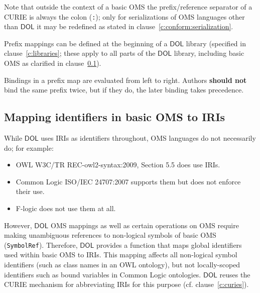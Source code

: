 \documentclass[10pt,fleqn,final]{scrreprt}
\makeatletter
\newcommand*{\cf}{cf.\@\xspace}
\newcommand*\CommentAuthor{}
\renewcommand*\CommentAuthor{#1}}
\newcommand*\CommentDate{}
\renewcommand*\CommentDate{#1}}
\newcommand*\CommentId{}
\renewcommand*\CommentId{#1}}
\newcommand*\CommentType{}
\renewcommand*\CommentType{#1}}
\newcommand*{\SetCommentColorByType}[1]{%
\edef\localType{{#1}}%
\expandafter\ifstrequal\localType{q-aut}{\colorlet{CommentColor}{red}}{%
\expandafter\ifstrequal\localType{q-all}{\colorlet{CommentColor}{orange}}{%
\expandafter\ifstrequal\localType{todo}{\colorlet{CommentColor}{orange}}{%
\expandafter\ifstrequal\localType{fyi}{\colorlet{CommentColor}{lightgray}}{%
\colorlet{CommentColor}{yellow}}}}}}
\newcommand*{\SetCommentPrefixByType}[1]{%
\edef\localType{{#1}}%
\expandafter\@ifmtarg\localType{%
\edef\CommentPrefix{}%
}{%
\caseupper[q]{#1}%
\edef\CommentPrefix{\thestring: }%
}}
\newcommand*{\initComment}[1]{%
\setkeys{Comment}{#1}%
\SetCommentColorByType{\CommentType}%
\relax%
\SetCommentPrefixByType{\CommentType}%
\relax%
}
\newcommand*{\todonote}[2][]{%
\initComment{#1}%
\pdfcomment[author=\CommentAuthor,color=CommentColor,date=\CommentDate,id=\CommentId]{%
\CommentPrefix
#2}}
\renewcommand*{\todonote}[2][]{%
\initComment{#1}%
\ednote{\CommentPrefix #2}}
\newcommand*{\CLnote}[2][author=Christoph Lange]{%
\todonote[author=Christoph Lange,#1]{#2} 
}
\newcommand*{\syntax}[1]{\texttt{#1}}
\newcommand*{\shouldnot}{\textbf{should not}\xspace}
\newcommand*{\DOL}{\ensuremath{\mathsf{DOL}}\xspace}
\newcommand{\clauserefname}{clause}
\newcommand{\cref}[1]{\clauserefname~\ref{#1}}
\newcommand{\ssclause}[1]{\subsection{#1}}
\newcommand{\nisref}[1]{#1}
\newenvironment{definitions}[0]{\medskip }{}
\makeatother
\begin{document}
\begin{definitions}

Note that outside the context of a basic OMS the prefix/reference separator of a CURIE is always the colon (\syntax{:}); only for serializations of OMS languages other than \DOL it may be redefined as stated in \cref{c:conform:serialization}.

Prefix mappings can be defined at the beginning of a \DOL library (specified in \cref{c:libraries}; 
these apply to all parts of the \DOL library, including basic OMS as clarified in \cref{c:map-ids}).  

Bindings in a prefix map are evaluated from left to right.  Authors \shouldnot bind the same prefix twice, but if they do, the later binding takes precedence.

\ssclause{Mapping identifiers in basic OMS to IRIs}\label{c:map-ids}

While \DOL uses IRIs as identifiers throughout, OMS languages do not necessarily do; for example:
\begin{itemize}
\item OWL \nisref{W3C/TR REC-owl2-syntax:2009, Section 5.5} does use IRIs.
\item Common Logic \nisref{ISO/IEC 24707:2007} supports them but does not enforce their use.
\item F-logic \cite{flogic} does not use them at all.
\end{itemize}
However, \DOL OMS mappings as well as 
certain operations on OMS require making unambiguous references to non-logical symbols of basic OMS (\syntax{SymbolRef}).  Therefore, \DOL provides a function that maps global identifiers used within basic OMS to IRIs.  This mapping affects all non-logical symbol identifiers (such as class names in an OWL ontology), but not locally-scoped identifiers such as bound variables in Common Logic ontologies.  \DOL reuses the CURIE mechanism for abbreviating IRIs for this purpose (\cf \cref{c:curies}).


\end{definitions}
\end{document}
